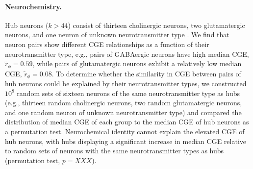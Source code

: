 \documentclass[10pt,letterpaper]{article}
\begin{document}
{%




\paragraph{Neurochemistry.}
Hub neurons ($k > 44$) consist of thirteen cholinergic neurons, two glutamatergic neurons, and one neuron of unknown neurotransmitter type \cite{Pereira:2015er}.
We find that neuron pairs show different CGE relationships as a function of their neurotransmitter type, e.g., pairs of GABAergic neurons have high median CGE, $\tilde{r}_\phi = 0.59$, while pairs of glutamatergic neurons exhibit a relatively low median CGE, $\tilde{r}_\phi = 0.08$.
To determine whether the similarity in CGE between pairs of hub neurons could be explained by their neurotransmitter types, we constructed $10^8$ random sets of sixteen neurons of the same neurotransmitter type as hubs (e.g., thirteen random cholinergic neurons, two random glutamatergic neurons, and one random neuron of unknown neurotransmitter type) and compared the distribution of median CGE of each group to the median CGE of hub neurons as a permutation test.
Neurochemical identity cannot explain the elevated CGE of hub neurons, with hubs displaying a significant increase in median CGE relative to random sets of neurons with the same neurotransmitter types as hubs (permutation test, $p = XXX$).

}
\end{document}
